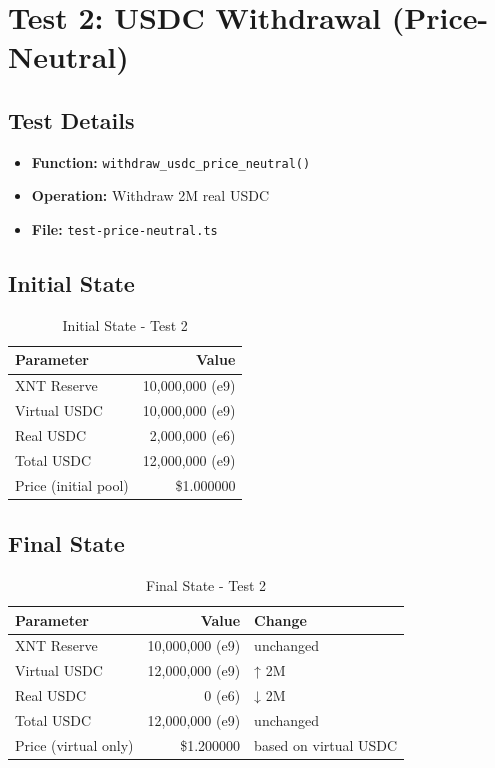 \documentclass[11pt,a4paper]{article}
\begin{document}
\newpage

\section{Test 2: USDC Withdrawal (Price-Neutral)}

\subsection{Test Details}
\begin{itemize}
    \item \textbf{Function:} \texttt{withdraw\_usdc\_price\_neutral()}
    \item \textbf{Operation:} Withdraw 2M real USDC
    \item \textbf{File:} \texttt{test-price-neutral.ts}
\end{itemize}

\subsection{Initial State}
\begin{table}[h]
\centering
\begin{tabular}{lr}
\toprule
\textbf{Parameter} & \textbf{Value} \\
\midrule
XNT Reserve & 10,000,000 (e9) \\
Virtual USDC & 10,000,000 (e9) \\
Real USDC & 2,000,000 (e6) \\
Total USDC & 12,000,000 (e9) \\
Price (initial pool) & \$1.000000 \\
\bottomrule
\end{tabular}
\caption{Initial State - Test 2}
\end{table}

\subsection{Final State}
\begin{table}[h]
\centering
\begin{tabular}{lrl}
\toprule
\textbf{Parameter} & \textbf{Value} & \textbf{Change} \\
\midrule
XNT Reserve & 10,000,000 (e9) & unchanged \\
Virtual USDC & 12,000,000 (e9) & ↑ 2M \\
Real USDC & 0 (e6) & ↓ 2M \\
Total USDC & 12,000,000 (e9) & unchanged \\
Price (virtual only) & \$1.200000 & based on virtual USDC \\
\bottomrule
\end{tabular}
\caption{Final State - Test 2}
\end{table}
\end{document}

